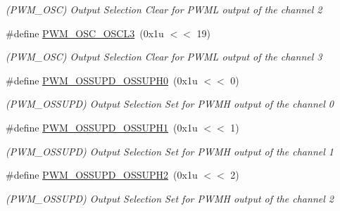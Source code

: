 \begin{DoxyCompactItemize}
\begin{DoxyCompactList}\small\item\em (P\+W\+M\+\_\+\+O\+SC) Output Selection Clear for P\+W\+ML output of the channel 2 \end{DoxyCompactList}\item 
\mbox{\label{group__SAMS70__PWM_ga705966b35a8986fdd48a787130c95e18}} 
\#define \mbox{\hyperlink{group__SAMS70__PWM_ga705966b35a8986fdd48a787130c95e18}{P\+W\+M\+\_\+\+O\+S\+C\+\_\+\+O\+S\+C\+L3}}~(0x1u $<$$<$ 19)
\begin{DoxyCompactList}\small\item\em (P\+W\+M\+\_\+\+O\+SC) Output Selection Clear for P\+W\+ML output of the channel 3 \end{DoxyCompactList}\item 
\mbox{\label{group__SAMS70__PWM_gaaf27588b697195288e1645c01de1aa8a}} 
\#define \mbox{\hyperlink{group__SAMS70__PWM_gaaf27588b697195288e1645c01de1aa8a}{P\+W\+M\+\_\+\+O\+S\+S\+U\+P\+D\+\_\+\+O\+S\+S\+U\+P\+H0}}~(0x1u $<$$<$ 0)
\begin{DoxyCompactList}\small\item\em (P\+W\+M\+\_\+\+O\+S\+S\+U\+PD) Output Selection Set for P\+W\+MH output of the channel 0 \end{DoxyCompactList}\item 
\mbox{\label{group__SAMS70__PWM_ga2fb78ee3b72236f21a37dcf5c45f6347}} 
\#define \mbox{\hyperlink{group__SAMS70__PWM_ga2fb78ee3b72236f21a37dcf5c45f6347}{P\+W\+M\+\_\+\+O\+S\+S\+U\+P\+D\+\_\+\+O\+S\+S\+U\+P\+H1}}~(0x1u $<$$<$ 1)
\begin{DoxyCompactList}\small\item\em (P\+W\+M\+\_\+\+O\+S\+S\+U\+PD) Output Selection Set for P\+W\+MH output of the channel 1 \end{DoxyCompactList}\item 
\mbox{\label{group__SAMS70__PWM_gabd9957d849685620c2b1386135c01bfe}} 
\#define \mbox{\hyperlink{group__SAMS70__PWM_gabd9957d849685620c2b1386135c01bfe}{P\+W\+M\+\_\+\+O\+S\+S\+U\+P\+D\+\_\+\+O\+S\+S\+U\+P\+H2}}~(0x1u $<$$<$ 2)
\begin{DoxyCompactList}\small\item\em (P\+W\+M\+\_\+\+O\+S\+S\+U\+PD) Output Selection Set for P\+W\+MH output of the channel 2 \end{DoxyCompactList}\item 

\end{DoxyCompactItemize}
